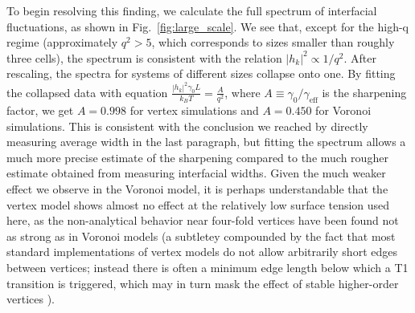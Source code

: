 \documentclass[twoside,twocolumn,9pt]{article}
\begin{document}
To begin resolving this finding, we calculate the full spectrum of interfacial fluctuations, as shown in Fig.~\ref{fig:large_scale}. We see that, except for the high-q regime (approximately $q^2>5$, which corresponds to sizes smaller than roughly three cells), the spectrum is consistent with the relation $|h_k|^2 \propto 1/q^2$. After rescaling, the spectra for systems of different sizes collapse onto one. By fitting the collapsed data with equation  $\frac{|h_k|^2\gamma_0 L}{k_B T} = \frac{A}{q^2}$, where $A\equiv \gamma_0/\gamma_{\text{eff}}$ is the sharpening factor, we get $A=0.998$ for vertex simulations and $A=0.450$ for Voronoi simulations. This is consistent with the conclusion we reached by directly measuring average width in the last paragraph, but fitting the spectrum allows a much more precise estimate of the sharpening compared to the much rougher estimate obtained from measuring interfacial widths. Given the much weaker effect we observe in the Voronoi model, it is perhaps understandable that the vertex model shows almost no effect at the relatively low surface tension used here, as the non-analytical behavior near four-fold vertices have been found not as strong as in Voronoi models \cite{lawson2024differences} (a subtletey compounded by the fact that most standard implementations of vertex models do not allow arbitrarily short edges between vertices; instead there is often a minimum edge length below which a T1 transition is triggered, which may in turn mask the effect of stable higher-order vertices \cite{yan2019multicellular}).
\end{document}
